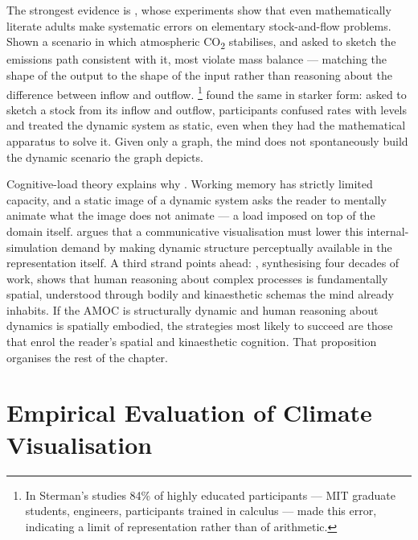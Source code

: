 The strongest evidence is \citet{sterman2008}, whose experiments show that even mathematically literate adults make systematic errors on elementary stock-and-flow problems. Shown a scenario in which atmospheric CO\textsubscript{2} stabilises, and asked to sketch the emissions path consistent with it, most violate mass balance --- matching the shape of the output to the shape of the input rather than reasoning about the difference between inflow and outflow.%
\footnote{In Sterman's studies 84\% of highly educated participants --- MIT graduate students, engineers, participants trained in calculus --- made this error, indicating a limit of representation rather than of arithmetic.} \citet{cronin2009} found the same in starker form: asked to sketch a stock from its inflow and outflow, participants confused rates with levels and treated the dynamic system as static, even when they had the mathematical apparatus to solve it. Given only a graph, the mind does not spontaneously build the dynamic scenario the graph depicts.



Cognitive-load theory explains why \citep{sweller1988, swellervanmerrienboer2019}. Working memory has strictly limited capacity, and a static image of a dynamic system asks the reader to mentally animate what the image does not animate --- a load imposed on top of the domain itself. \citet{ware2021} argues that a communicative visualisation must lower this internal-simulation demand by making dynamic structure perceptually available in the representation itself. A third strand points ahead: \citet{tversky2019}, synthesising four decades of work, shows that human reasoning about complex processes is fundamentally spatial, understood through bodily and kinaesthetic schemas the mind already inhabits. If the AMOC is structurally dynamic and human reasoning about dynamics is spatially embodied, the strategies most likely to succeed are those that enrol the reader's spatial and kinaesthetic cognition. That proposition organises the rest of the chapter.

\section{Empirical Evaluation of Climate Visualisation}
\label{sec:empirical-viz}

